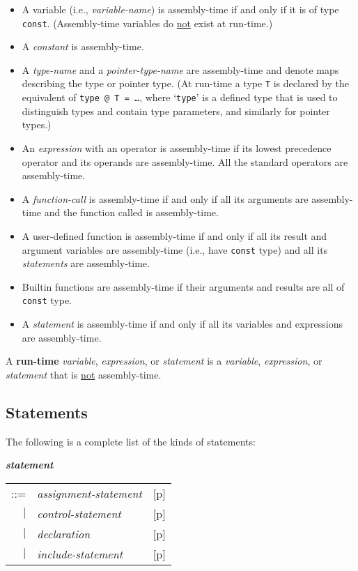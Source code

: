 \documentclass[12pt]{article}
\newcommand{\key}[1]{{\rm \bfseries #1}}
\newcommand{\emkey}[1]{{\em \bfseries #1}}
\newcommand{\pagref}[1]{p\pageref{#1}}
\newenvironment{indpar}[1][0.3in]%
	{\begin{list}{}%
		     {\setlength{\itemsep}{0in}%
		      \setlength{\topsep}{0in}%
		      \setlength{\parsep}{1ex}%
		      \setlength{\labelwidth}{#1}%
		      \setlength{\leftmargin}{#1}%
		      \addtolength{\leftmargin}{\labelsep}}%
	 \item}%
	{\end{list}}
\begin{document}
\begin{itemize}
\item A variable (i.e., {\em variable-name})
is assembly-time if and only if it is of type {\tt const}.
(Assembly-time variables do \underline{not} exist at run-time.)
\item A {\em constant} is assembly-time.
\item A {\em type-name} and a {\em pointer-type-name} are assembly-time
and denote maps describing the type or pointer type.
(At run-time a type {\tt T} is declared by the
equivalent of {\tt type @ T = \ldots}, where `{\tt type}' is a
defined type that is
used to distinguish types and contain type parameters, and
similarly for pointer types.)
\item An {\em expression} with an operator is
      assembly-time if its lowest precedence operator
      and its operands are assembly-time.
      All the standard operators are assembly-time.
\item A {\em function-call} is assembly-time if and only if all its
      arguments are assembly-time and the function called is
      assembly-time.
\item A user-defined function is assembly-time if and only if all its
      result and argument variables are assembly-time (i.e., have
      {\tt const} type) and all its
      {\em statements} are assembly-time.
\item Builtin functions are assembly-time if their arguments and
      results are all of {\tt const} type.
\item A {\em statement} is assembly-time if and only if all its
      variables and expressions are assem\-bly-time.
\end{itemize}

A \key{run-time} {\em variable}, {\em expression}, or {\em statement}
is a {\em variable}, {\em expression}, or {\em statement} that is
\underline{not} assembly-time.

\subsection{Statements}
\label{STATEMENTS}

The following is a complete list of the kinds of statements:
\begin{indpar}
\emkey{statement}\label{STATEMENT}
    \begin{tabular}[t]{@{}rll}
    ::= & {\em assignment-statement}
        & [\pagref{ASSIGNMENT-STATEMENTS}] \\
    $|$ & {\em control-statement}
        & [\pagref{CONTROL-STATEMENT}] \\
    $|$ & {\em declaration}
        & [\pagref{DECLARATIONS}] \\
    $|$ & {\em include-statement}
        & [\pagref{INCLUDE-STATEMENTS}] \\
    \end{tabular}
\end{indpar}
\end{document}
